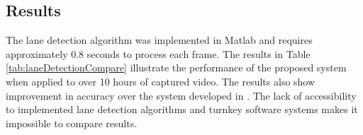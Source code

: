 \documentclass{article}
\begin{document}
\subsection{Results}
The lane detection algorithm was implemented in Matlab and requires
approximately 0.8 seconds to process each frame.
The results in Table \ref{tab:laneDetectionCompare} illustrate the performance of the proposed system when applied to over 10 hours of captured video. The results also show improvement in accuracy over the system developed in \cite{borkar_layered_2009}. The lack of accessibility to implemented lane detection algorithms and turnkey software systems makes it impossible to compare results.
\begin{table}[htb!]
\caption{Accuracy of the lane detection system}
\label{tab:laneDetectionCompare}
\end{table}\\
\end{document}
